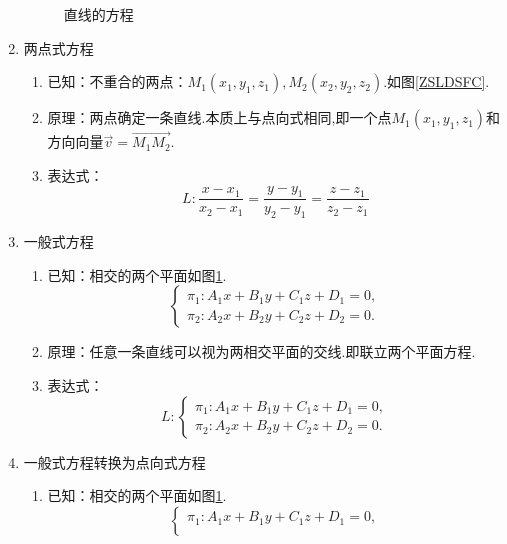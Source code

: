 \begin{enumerate}[\large1.]
\begin{figure}[h]
{\begin{minipage}[b]{0.5\linewidth}
				\label{ZSYBFC}
			\end{minipage}
		}
		\caption{直线的方程\uppercase\expandafter{}}
	\end{figure}
	\item  {\color{dy}\large 两点式方程}\label{两点式方程}
	\begin{enumerate}[]
		\item 已知：{\color{dl}不重合的两点}：$M_1(x_1,y_1,z_1),M_2(x_2,y_2,z_2)$.如图\ref{ZSLDSFC}.
		\item 原理：两点确定一条直线.本质上与点向式相同,即一个点$M_1(x_1,y_1,z_1)$和方向向量$\overrightarrow{v}=\overrightarrow{M_1M_2}$.
		\item 表达式：
		\begin{equation}
		L: \frac{x-x_1}{x_2-x_1}=\frac{y-y_1}{y_2-y_1}=\frac{z-z_1}{z_2-z_1}
		\end{equation}
	\end{enumerate}
	\newpage 
	\item  {\color{dy}\large 一般式方程}
	\begin{enumerate}[]
		\item 已知：{\color{dl}相交的两个平面}如图\ref{ZSYBFC}.
		\begin{equation*}
		\begin{cases}
		\pi_1:A_1x+B_1y+C_1z+D_1=0,\\
		\pi_2:A_2x+B_2y+C_2z+D_2=0.
		\end{cases}
		\end{equation*}
		\item 原理：任意一条直线可以视为两相交平面的交线.即联立两个平面方程.
		\item 表达式：
		\begin{equation}
		L: \begin{cases}
		\pi_1:A_1x+B_1y+C_1z+D_1=0,\\
		\pi_2:A_2x+B_2y+C_2z+D_2=0.
		\end{cases}
		\end{equation}
	\end{enumerate}
	\item  {\color{dy}\large 一般式方程转换为点向式方程}
	\begin{enumerate}[]
		\item 已知：{\color{dl}相交的两个平面}如图\ref{ZSYBFC}.
		\begin{equation*}
		\begin{cases}
		\pi_1:A_1x+B_1y+C_1z+D_1=0,\\

\end{cases}
\end{equation*}
\end{enumerate}
\end{enumerate}
